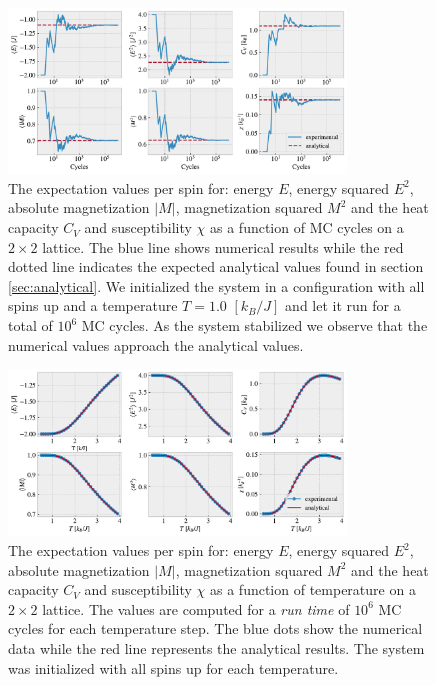 \documentclass[%
 reprint,
nofootinbib,
aps,
]{revtex4-1}
\begin{document}
\begin{figure}[H]
  \centering
  \includegraphics[width=0.8\textwidth]{figures/equilibrium_benchmark.pdf} 
  \caption{The expectation values per spin for: energy $E$, energy squared $E^2$, absolute magnetization $|M|$, magnetization squared $M^2$ and the heat capacity $C_V$ and susceptibility $\chi$ as a function of MC cycles on a $2\times2$ lattice. The blue line shows numerical results while the red dotted line indicates the expected analytical values found in section \ref{sec:analytical}. We initialized the system in a configuration with all spins up and a temperature $T = 1.0$ $[k_B/J]$ and let it run for a total of $10^6$ MC cycles. As the system stabilized we observe that the numerical values approach the analytical values.}
  \label{fig:equilibrium_benchmark}
\end{figure}
\begin{figure}[H]
  \centering
  \includegraphics[width=0.8\textwidth]{figures/phase_benchmark.pdf}
  \caption{The expectation values per spin for: energy $E$, energy squared $E^2$, absolute magnetization $|M|$, magnetization squared $M^2$ and the heat capacity $C_V$ and susceptibility $\chi$ as a function of temperature on a $2\times2$ lattice. The values are computed for a \textit{run time} of $10^6$ MC cycles for each temperature step. The blue dots show the numerical data while the red line represents the analytical results. The system was initialized with all spins up for each temperature.}
  \label{fig:phase_benchmark}
\end{figure}
\end{document}
